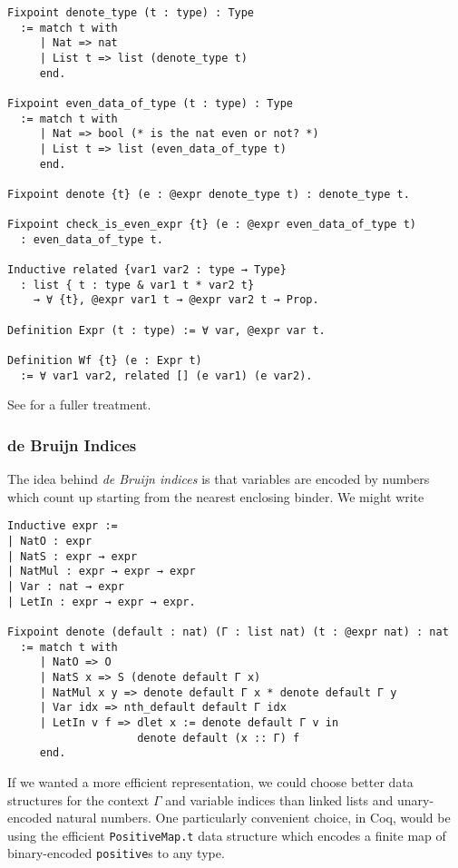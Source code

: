 \begin{verbatim}
Fixpoint denote_type (t : type) : Type
  := match t with
     | Nat => nat
     | List t => list (denote_type t)
     end.

Fixpoint even_data_of_type (t : type) : Type
  := match t with
     | Nat => bool (* is the nat even or not? *)
     | List t => list (even_data_of_type t)
     end.

Fixpoint denote {t} (e : @expr denote_type t) : denote_type t.

Fixpoint check_is_even_expr {t} (e : @expr even_data_of_type t)
  : even_data_of_type t.

Inductive related {var1 var2 : type → Type}
  : list { t : type & var1 t * var2 t}
    → ∀ {t}, @expr var1 t → @expr var2 t → Prop.

Definition Expr (t : type) := ∀ var, @expr var t.

Definition Wf {t} (e : Expr t)
  := ∀ var1 var2, related [] (e var1) (e var2).
\end{verbatim}

See \textcite{PhoasICFP08} for a fuller treatment.

\subsubsection{de Bruijn Indices} \label{sec:binders:de-bruijn}
The idea behind \emph{de Bruijn indices} is that variables are encoded by numbers which count up starting from the nearest enclosing binder.
We might write
\begin{verbatim}
Inductive expr :=
| NatO : expr
| NatS : expr → expr
| NatMul : expr → expr → expr
| Var : nat → expr
| LetIn : expr → expr → expr.

Fixpoint denote (default : nat) (Γ : list nat) (t : @expr nat) : nat
  := match t with
     | NatO => O
     | NatS x => S (denote default Γ x)
     | NatMul x y => denote default Γ x * denote default Γ y
     | Var idx => nth_default default Γ idx
     | LetIn v f => dlet x := denote default Γ v in
                    denote default (x :: Γ) f
     end.
\end{verbatim}
If we wanted a more efficient representation, we could choose better data structures for the context $\Gamma$ and variable indices than linked lists and unary-encoded natural numbers.
One particularly convenient choice, in Coq, would be using the efficient \texttt{PositiveMap.t} data structure which encodes a finite map of binary-encoded \texttt{positive}s to any type.

